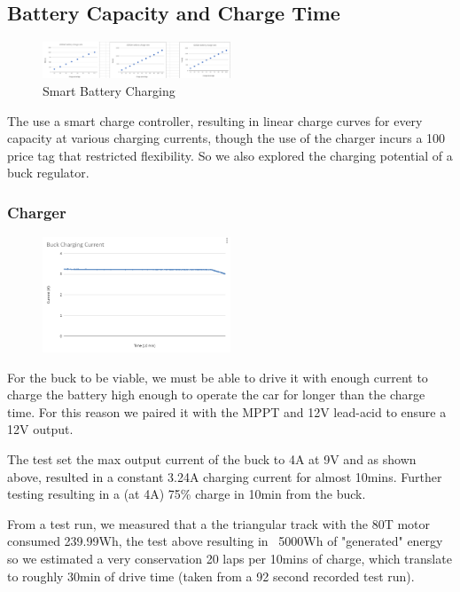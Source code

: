 \documentclass[11pt]{article}
\begin{document}
\newpage
\subsection{Battery Capacity and Charge Time}
\begin{figure}[h!]
    \begin{center}
        \includegraphics[width=0.5\textwidth]{inc/bat.png}
        \caption{Smart Battery Charging}
    \end{center}
\end{figure}

The use a smart charge controller, resulting in linear charge curves for every capacity at various charging currents, though the use of the charger incurs a 100 price tag that restricted flexibility. So we also explored the charging potential of a buck regulator.


\subsubsection*{Charger}
\begin{figure}[h!]
    \begin{center}
        \includegraphics[width=0.5\textwidth]{inc/BUCK.png}
    \end{center}
\end{figure}

For the buck to be viable, we must be able to drive it with enough current to charge the battery high enough to operate the car for longer than the charge time.
For this reason we paired it with the MPPT and 12V lead-acid to ensure a 12V output. 

The test set the max output current of the buck to 4A at 9V and as shown above, resulted in a constant 3.24A charging current for almost 10mins. Further testing resulting in a (at 4A) 75\% charge in 10min from the buck.

From a test run, we measured that a the triangular track with the 80T motor consumed 239.99Wh, the test above resulting in ~5000Wh of "generated" energy so we estimated a very conservation 20 laps per 10mins of charge, which translate to roughly 30min of drive time (taken from a 92 second recorded test run).
\end{document}
